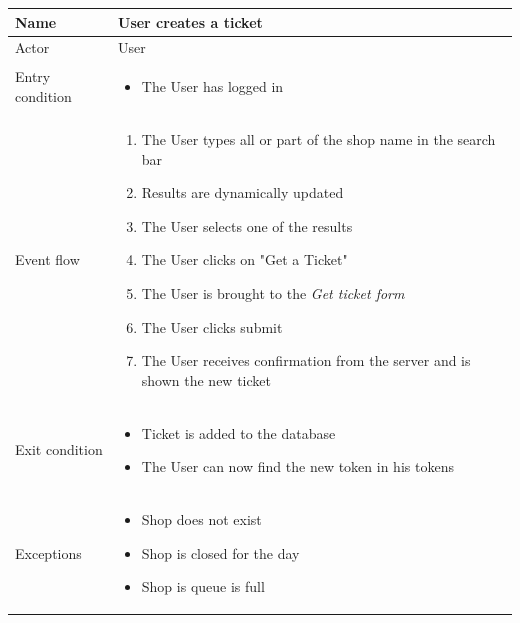 \begin{table}[H]
    \begin{tabu} to \textwidth {|X|X[4]|}
        \hline
        Name            & User creates a ticket      \\ \hline
        Actor           & User                       \\ \hline
        Entry condition & \begin{itemize}
            \item The User has logged in
        \end{itemize} \\ \hline
        Event flow      & \begin{enumerate}
            \item The User types all or part of the shop name in the search bar
            \item Results are dynamically updated
            \item The User selects one of the results
            \item The User clicks on "Get a Ticket"
            \item The User is brought to the \emph{Get ticket form}
            \item The User clicks submit
            \item The User receives confirmation from the server and is shown the new ticket
        \end{enumerate} \\ \hline
        Exit condition  & \begin{itemize}
            \item Ticket is added to the database
            \item The User can now find the new token in his tokens
        \end{itemize} \\ \hline
        Exceptions      & \begin{itemize}
            \item Shop does not exist
            \item Shop is closed for the day
            \item Shop is queue is full
        \end{itemize} \\ \hline
    \end{tabu}
\end{table}

